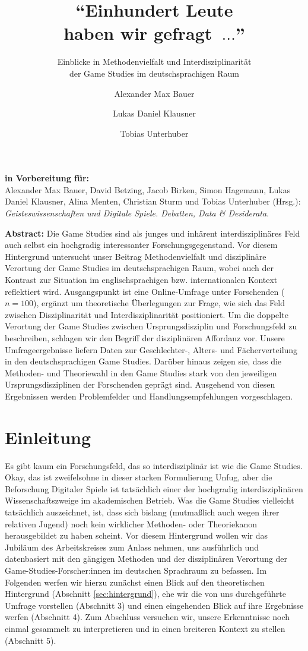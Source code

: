 \documentclass{scrartcl}
\title{\enquote{Einhundert Leute\\haben wir gefragt~$\ldots$}}
\subtitle{Einblicke in Methodenvielfalt und Interdisziplinarität\\der Game Studies im deutschsprachigen Raum}
\author[1]{Alexander Max Bauer}
\author[2]{Lukas Daniel Klausner}
\author[3]{Tobias Unterhuber}
\affil[1]{ Carl von Ossietzky Universität Oldenburg, Institut für Philosophie}
\affil[2]{ Fachhochschule St. Pölten, Institut für IT Sicherheitsforschung}
\affil[3]{ Universität Innsbruck, Institut für Germanistik}
\date{}
\begin{document}
\maketitle
\thispagestyle{empty}

\begin{center}
   \textbf{\textsf{in Vorbereitung für:}}\\
   Alexander Max Bauer, David Betzing, Jacob Birken, Simon Hagemann, Lukas Daniel Klausner, Alina Menten, Christian Sturm und Tobias Unterhuber (Hrsg.): \textit{Geisteswissenschaften und Digitale Spiele. Debatten, Data \& Desiderata}.
\end{center}

\vfill
\noindent\textbf{\textsf{Abstract:}}
Die Game Studies sind als junges und inhärent interdisziplinäres Feld auch selbst ein hochgradig interessanter Forschungsgegenstand.
Vor diesem Hintergrund untersucht unser Beitrag Methodenvielfalt und disziplinäre Verortung der Game Studies im deutschsprachigen Raum, wobei auch der Kontrast zur Situation im englischsprachigen bzw. internationalen Kontext reflektiert wird.
Ausgangspunkt ist eine Online-Umfrage unter Forschenden ($n = 100$), ergänzt um theoretische Überlegungen zur Frage, wie sich das Feld zwischen Disziplinarität und Interdisziplinarität positioniert.
Um die doppelte Verortung der Game Studies zwischen Ursprungsdisziplin und Forschungsfeld zu beschreiben, schlagen wir den Begriff der disziplinären Affordanz vor.
Unsere Umfrageergebnisse liefern Daten zur Geschlechter-, Alters- und Fächerverteilung in den deutschsprachigen Game Studies.
Darüber hinaus zeigen sie, dass die Methoden- und Theoriewahl in den Game Studies stark von den jeweiligen Ursprungsdisziplinen der Forschenden geprägt sind.
Ausgehend von diesen Ergebnissen werden Problemfelder und Handlungsempfehlungen vorgeschlagen.


\newpage
\section{Einleitung}\label{sec:einleitung}
Es gibt kaum ein Forschungsfeld, das so interdisziplinär ist wie die Game Studies.
Okay, das ist zweifelsohne in dieser starken Formulierung Unfug, aber die Beforschung Digitaler Spiele ist tatsächlich einer der hochgradig interdisziplinären Wissenschaftszweige im akademischen Betrieb.
Was die Game Studies vielleicht tatsächlich auszeichnet, ist, dass sich bislang (mutmaßlich auch wegen ihrer relativen Jugend)\autocite[Vgl.][]{unterhuber_magic_2022} noch kein wirklicher Methoden- oder Theoriekanon herausgebildet zu haben scheint.
Vor diesem Hintergrund wollen wir das Jubiläum des Arbeitskreises zum Anlass nehmen, uns ausführlich und datenbasiert mit den gängigen Methoden und der disziplinären Verortung der Game-Studies-Forscher:innen im deutschen Sprachraum zu befassen.
Im Folgenden werfen wir hierzu zunächst einen Blick auf den theoretischen Hintergrund (Abschnitt \ref{sec:hintergrund}), ehe wir die von uns durchgeführte Umfrage vorstellen (Abschnitt 3) und einen eingehenden Blick auf ihre Ergebnisse werfen (Abschnitt 4).
Zum Abschluss versuchen wir, unsere Erkenntnisse noch einmal gesammelt zu interpretieren und in einen breiteren Kontext zu stellen (Abschnitt 5).
\end{document}
